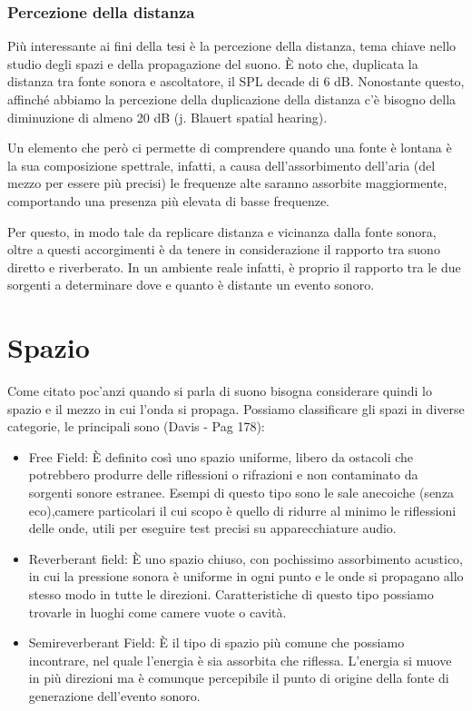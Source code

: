 \subsubsection{Percezione della distanza}
Più interessante ai fini della tesi è la percezione della distanza, tema chiave nello studio degli spazi e della propagazione del suono.
È noto che, duplicata la distanza tra fonte sonora e ascoltatore, il SPL decade di 6 dB.
Nonostante questo, affinché abbiamo la percezione della duplicazione della distanza c’è bisogno della diminuzione di almeno 20 dB (j. Blauert spatial hearing).

Un elemento che però ci permette di comprendere quando una fonte è lontana è la sua composizione spettrale, infatti, a causa dell’assorbimento dell’aria (del mezzo per essere più precisi) le frequenze alte saranno assorbite maggiormente, comportando una presenza più elevata di basse frequenze.

Per questo, in modo tale da replicare distanza e vicinanza dalla fonte sonora, oltre a questi accorgimenti è da tenere in considerazione il rapporto tra suono diretto e riverberato.
In un ambiente reale infatti, è proprio il rapporto tra le due sorgenti a determinare dove e quanto è distante un evento sonoro.

\section{Spazio}
Come citato poc'anzi quando si parla di suono bisogna considerare quindi lo spazio e il mezzo in cui l'onda si propaga.
Possiamo classificare gli spazi in diverse categorie, le principali sono (Davis - Pag 178):
\begin{itemize}
\item Free Field:
È definito così uno spazio uniforme, libero da ostacoli che potrebbero produrre delle riflessioni o rifrazioni e non contaminato da sorgenti sonore estranee.
Esempi di questo tipo sono le sale anecoiche (senza eco),camere particolari il cui scopo è quello di ridurre al minimo le riflessioni delle onde, utili per eseguire test precisi su apparecchiature audio.
\item Reverberant field:
È uno spazio chiuso, con pochissimo assorbimento acustico, in cui la pressione sonora è uniforme in ogni punto e le onde si propagano allo stesso modo in tutte le direzioni.
Caratteristiche di questo tipo possiamo trovarle in luoghi come camere vuote o cavità.
\item Semireverberant Field:
È il tipo di spazio più comune che possiamo incontrare, nel quale l’energia è sia assorbita che riflessa. L’energia si muove in più direzioni ma è comunque percepibile il punto di origine della fonte di generazione dell’evento sonoro.
\end{itemize}
